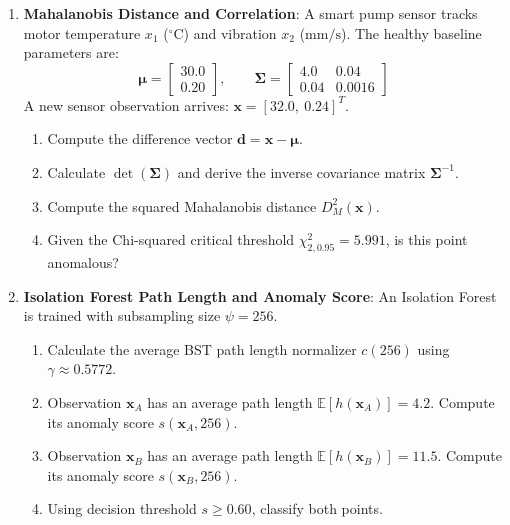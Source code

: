 \begin{checkyourself}
\begin{enumerate}
    \item \textbf{Mahalanobis Distance and Correlation}:
    A smart pump sensor tracks motor temperature $x_1$ ($^\circ\text{C}$) and vibration $x_2$ ($\text{mm/s}$). The healthy baseline parameters are:
    \begin{equation*}
    \boldsymbol{\mu} = \begin{bmatrix} 30.0 \\ 0.20 \end{bmatrix}, \qquad \mathbf{\Sigma} = \begin{bmatrix} 4.0 & 0.04 \\ 0.04 & 0.0016 \end{bmatrix}
    \end{equation*}
    A new sensor observation arrives: $\mathbf{x} = [32.0, \ 0.24]^T$.
    \begin{enumerate}[label=(\alph*)]
        \item Compute the difference vector $\mathbf{d} = \mathbf{x} - \boldsymbol{\mu}$.
        \item Calculate $\det(\mathbf{\Sigma})$ and derive the inverse covariance matrix $\mathbf{\Sigma}^{-1}$.
        \item Compute the squared Mahalanobis distance $D_M^2(\mathbf{x})$.
        \item Given the Chi-squared critical threshold $\chi^2_{2, 0.95} = 5.991$, is this point anomalous?
    \end{enumerate}

    \item \textbf{Isolation Forest Path Length and Anomaly Score}:
    An Isolation Forest is trained with subsampling size $\psi = 256$.
    \begin{enumerate}[label=(\alph*)]
        \item Calculate the average BST path length normalizer $c(256)$ using $\gamma \approx 0.5772$.
        \item Observation $\mathbf{x}_A$ has an average path length $\mathbb{E}[h(\mathbf{x}_A)] = 4.2$. Compute its anomaly score $s(\mathbf{x}_A, 256)$.
        \item Observation $\mathbf{x}_B$ has an average path length $\mathbb{E}[h(\mathbf{x}_B)] = 11.5$. Compute its anomaly score $s(\mathbf{x}_B, 256)$.
        \item Using decision threshold $s \ge 0.60$, classify both points.
    \end{enumerate}


\end{enumerate}
\end{checkyourself}
